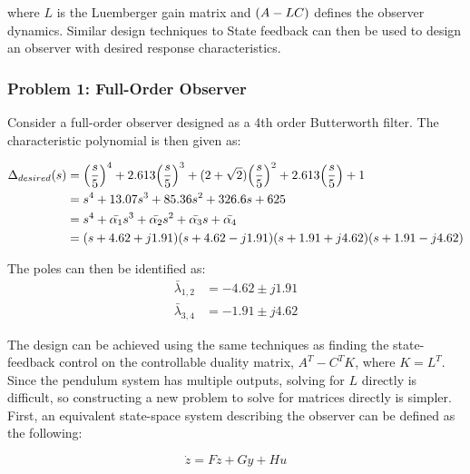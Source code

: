 \documentclass[]{article}
\begin{document}
		where $L$ is the Luemberger gain matrix and $\qty(A - LC)$ defines the observer dynamics. Similar design techniques to State feedback can then be used to design an observer with desired response characteristics.
		
		\subsubsection{Problem 1: Full-Order Observer}
			
		 	Consider a full-order observer designed as a 4th order Butterworth filter. The characteristic polynomial is then given as:
		 	
		 	\begin{equation}
		 		\begin{aligned}
		 			\Delta_{desired} (s) &= \qty(\frac{s}{5})^4 + 2.613 \qty(\frac{s}{5})^3 + (2 + \sqrt{2}) \qty(\frac{s}{5})^2 + 2.613 \qty(\frac{s}{5}) + 1\\
		 								&= s^4 + 13.07 s^3 + 85.36 s^2 + 326.6 s + 625\\
		 								&= s^4 + \bar{\alpha_1} s^3 + \bar{\alpha_2} s^2 + \bar{\alpha_3} s + \bar{\alpha_4}\\
		 								&= (s+4.62 + j 1.91)(s+4.62 - j 1.91)(s + 1.91 + j4.62)(s+1.91 - j4.62)
		 		\end{aligned}\label{eq:full_obsv_char_poly}
		 	\end{equation}
	 		
	 		The poles can then be identified as:
	 		\begin{equation}
	 			\begin{aligned}
	 				\bar{\lambda}_{1,2} &= -4.62 \pm j 1.91\\
	 				\bar{\lambda}_{3,4} &= -1.91 \pm j 4.62
	 			\end{aligned}
 				\label{eq:full_obsv_poles}
	 		\end{equation}
	 		
	 		The design can be achieved using the same techniques as finding the state-feedback control on the controllable duality matrix, $A^T - C^T K$, where $K = L^T$.\\
	 		
	 		Since the pendulum system has multiple outputs, solving for $L$ directly is difficult, so constructing a new problem to solve for matrices directly is simpler. First, an equivalent state-space system describing the observer can be defined as the following:
	 		
	 		\begin{equation}
	 			\dot{z} = F z + G y + H u
	 			\label{eq:full_order_obsv_def}
	 		\end{equation}
 			
\end{document}
